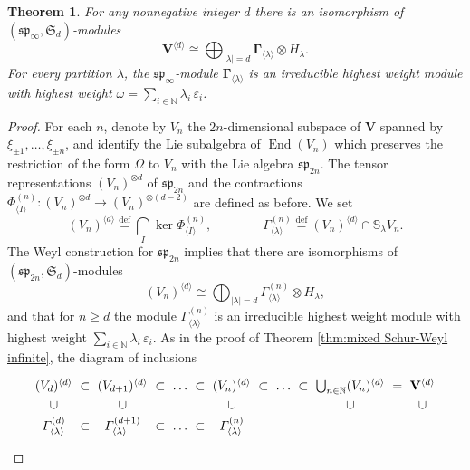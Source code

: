 \documentclass[12pt,reqno]{amsart}
\numberwithin{equation}{section}
\theoremstyle{plain}
\newtheorem{thm}{Theorem}[section]
\theoremstyle{definition}
\def\N{\mathbb N}
\def\eps{\varepsilon}
\def\bydef{\overset{\mathrm {def}}=}
\def\sp{\mathfrak{sp}}
\DeclareMathOperator{\End}{End} %
\def\o{\otimes}
\def\spV_#1{\boldsymbol\Gamma_{\<#1\>}}
\def\SS{\mathbb S}
\def\VV{\mathbf V}
\def\<{\langle}
\def\>{\rangle}
\begin{document}
\begin{thm}\label{thm:sp Schur-Weyl infinite}
For any nonnegative integer $d$ there is an isomorphism of
$(\sp_\infty,\mathfrak S_d)$-modules
\begin{equation}\label{eq:sp Schur-Weyl infinite}
    \VV^{\<d\>} \cong \bigoplus_{|\lambda| = d} \spV_\lambda \o
    H_\lambda.
\end{equation}
For every partition $\lambda$, the $\sp_\infty$-module
$\spV_{\lambda}$ is an irreducible highest weight module with
highest weight $\omega = \sum_{i \in \N} \lambda_i \, \eps_i$.
\end{thm}

\begin{proof}
For each $n$, denote by $V_{n}$ the $2n$-dimensional subspace of
$\VV$ spanned by $\xi_{\pm 1},\dots,\xi_{\pm n}$, and identify the
Lie subalgebra of $\End(V_n)$ which preserves the restriction of the form $\Omega$
to $V_{n}$ with the Lie algebra $\sp_{2n}$. The tensor representations
$(V_{n})^{\o d}$ of $\sp_{2n}$ and the contractions
$\Phi_{\<I\>}^{(n)}: (V_{n})^{\o d} \to (V_{n})^{\o(d-2)}$ are
defined as before. We set
\begin{equation*}
    (V_{n})^{\<d\>} \bydef \bigcap_{I} \ker \Phi_{\<I\>}^{(n)},
    \qquad\qquad
    \varGamma_{\<\lambda\>}^{(n)} \bydef  (V_{n})^{ \<d\> } \cap \SS_\lambda V_{n}.
\end{equation*}
The Weyl construction for $\sp_{2n}$ implies that there are
isomorphisms of $(\sp_{2n},\mathfrak S_d)$-modules
\begin{equation}\label{eq:sp Schur-Weyl finite}
    (V_n)^{\<d\>} \cong \bigoplus_{|\lambda|=d}
    \varGamma_{\<\lambda\>}^{(n)} \o H_\lambda,
\end{equation}
and that for $n\ge d$ the module $\varGamma_{\<\lambda\>}^{(n)}$ is
an irreducible highest weight module with highest weight $\sum_{i
\in \N} \lambda_i \, \eps_i$. As in the proof of Theorem
\ref{thm:mixed Schur-Weyl infinite}, the diagram of inclusions
\begin{equation}\label{eq:exhaustions sp}
\begin{gathered}\xymatrix@C=0pt@R=0pt{
    (V_d)^{\<d\>} & \subset & (V_{d+1})^{\<d\>} & \subset &\dots &\subset &(V_n)^{\<d\>}
    &\subset &\dots &\subset  &\bigcup_{n\in\N} (V_n)^{ \<d\> } & = & \VV^{\<d\>}
    \\
    \cup &&      \cup &&     &&     \cup &&     &&     \cup &&    \cup
    \\
    \varGamma_{\<\lambda\>}^{(d)} & \subset & \varGamma_{\<\lambda\>}^{(d+1)} &\subset &\dots &\subset &\varGamma_{\<\lambda\>}^{(n)}
}
\end{gathered}
\end{equation}
\end{proof}
\end{document}
